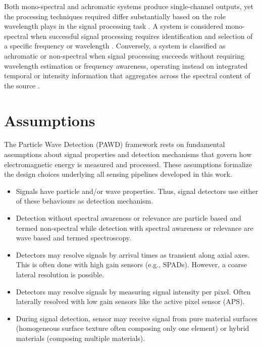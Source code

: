 \documentclass[12pt,a4paper,oneside]{report}
\let\oldsection\section
\renewcommand{\section}{\clearpage\oldsection}
\begin{document}
Both mono-spectral and achromatic systems produce single-channel outputs, yet the processing techniques required differ substantially based on the role wavelength plays in the signal processing task \cite{elachi2021}. A system is considered mono-spectral when successful signal processing requires identification and selection of a specific frequency or wavelength \cite{schott2007}. Conversely, a system is classified as achromatic or non-spectral when signal processing succeeds without requiring wavelength estimation or frequency awareness, operating instead on integrated temporal or intensity information that aggregates across the spectral content of the source \cite{su2016,becker2023}.

\section{Assumptions}
\label{sec:pawd_assumptions}

The Particle Wave Detection (PAWD) framework rests on fundamental assumptions about signal properties and detection mechanisms that govern how electromagnetic energy is measured and processed. These assumptions formalize the design choices underlying all sensing pipelines developed in this work.

\begin{itemize}
    \item Signals have particle and/or wave properties. Thus, signal detectors use either of these behaviours as detection mechanism.
    
    \item Detection without spectral awareness or relevance are particle based and termed non-spectral while detection with spectral awareness or relevance are wave based and termed spectroscopy.
    
    \item Detectors may resolve signals by arrival times as transient along axial axes. This is often done with high gain sensors (e.g., SPADs). However, a coarse lateral resolution is possible.
    
    \item Detectors may resolve signals by measuring signal intensity per pixel. Often laterally resolved with low gain sensors like the active pixel sensor (APS).
    
    \item During signal detection, sensor may receive signal from pure material surfaces (homogeneous surface texture often composing only one element) or hybrid materials (composing multiple materials).
\end{itemize}
\end{document}
